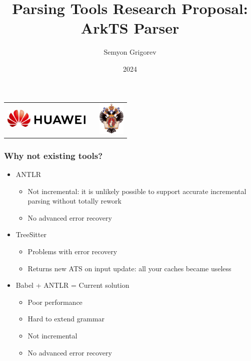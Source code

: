 \documentclass[xcolor=table,aspectratio=169]{beamer}
\title[ArkTS Parser]{Parsing Tools Research Proposal: ArkTS Parser}
\institute[SPbSU]{
Saint Petersburg State University
}
\author[Semyon Grigorev]{Semyon Grigorev}
\date{2024}
\begin{document}
{
\begin{frame}[fragile]
  \begin{table}
  \centering  
  \begin{tabularx}{\linewidth}{XcX}
    \includegraphics[height=0.9cm]{pictures/hu_logo.jpeg} \hfill
    & 
    & \hfill \includegraphics[height=1.6cm]{pictures/SPbGU_Logo.png}
  \end{tabularx}
  \end{table}
  \titlepage
\end{frame}
}

\begin{frame}[fragile]
  \frametitle{Why not existing tools?}  
  \begin{itemize}
    \item ANTLR
    \begin{itemize}
      \item[\faFrownO] Not incremental: it is unlikely possible to support accurate incremental parsing without totally rework
      \item[\faFrownO] No advanced error recovery 
    \end{itemize}
    \item TreeSitter
    \begin{itemize}
      \item[\faFrownO] Problems with error recovery
      \item[\faFrownO] Returns new ATS on input update: all your caches became useless
    \end{itemize}
    \item Babel + ANTLR = Current solution
    \begin{itemize}
      \item[\faFrownO] Poor performance
      \item[\faFrownO] Hard to extend grammar
      \item[\faFrownO] Not incremental
      \item[\faFrownO] No advanced error recovery 
    \end{itemize}
  \end{itemize} 
\end{frame}
\end{document}
